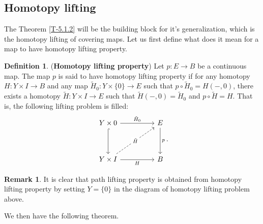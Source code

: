 \documentclass[letterpaper,11pt,twoside]{article}
\theoremstyle{definition}
\theoremstyle{definition}
\newtheorem{definition}[proposition]{Definition}
\theoremstyle{definition}
\newtheorem{remark}[proposition]{\textbf{Remark}}
\theoremstyle{definition}
\theoremstyle{definition}
\theoremstyle{definition}
\theoremstyle{remark}
\theoremstyle{definition}
\begin{document}
\subsection{Homotopy lifting}
The Theorem \ref{T-5.1.2} will be the building block for it's generalization, which is the homotopy lifting of covering maps. Let us first define what does it mean for a map to have homotopy lifting property.
\begin{definition}
(\textbf{Homotopy lifting property}) Let $p : E\to B$ be a continuous map. The map $p$ is said to have homotopy lifting property if for any homotopy $H : Y\times I \to B$ and any map $\tilde{H}_0 : Y\times \{0\} \to E$ such that $p \circ \tilde{H}_0 = H(-, 0)$, there exists a homotopy $\tilde H : Y\times I \to E$ such that $\tilde{H}(-,0) = \tilde{H}_0$ and $p\circ \tilde{H} = H$. That is, the following lifting problem is filled:
\[\begin{tikzcd}
	{Y\times{0}} && E \\
	\\
	{Y\times I} && B
	\arrow["H"', from=3-1, to=3-3]
	\arrow["p", from=1-3, to=3-3]
	\arrow[hook, from=1-1, to=3-1]
	\arrow["{\tilde{H}_0}", from=1-1, to=1-3]
	\arrow["{\tilde{H}}"{description}, dashed, from=3-1, to=1-3]
\end{tikzcd}.\]
\end{definition}
\begin{remark}
It is clear that path lifting property is obtained from homotopy lifting property by setting $Y = \{0\}$ in the diagram of homotopy lifting problem above.
\end{remark}
We then have the following theorem.
\end{document}

